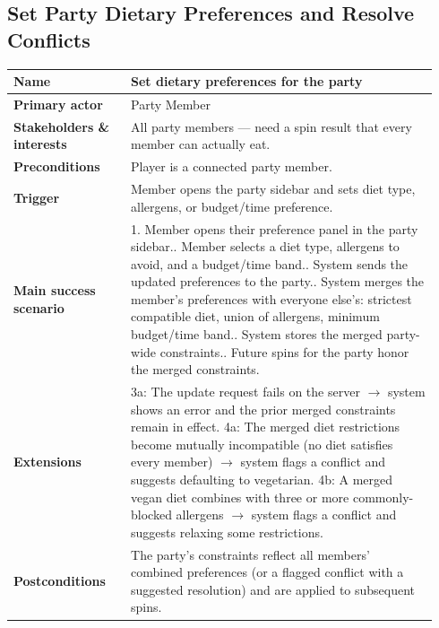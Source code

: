 \documentclass[sigconf]{acmart}
\begin{document}
\subsection*{Set Party Dietary Preferences and Resolve Conflicts}
{\footnotesize
\begin{supertabular}{@{}p{0.26\linewidth}p{0.68\linewidth}@{}}
\textbf{Name} & Set dietary preferences for the party \\
\hline
\textbf{Primary actor} & Party Member \\
\hline
\textbf{Stakeholders \& interests} & All party members --- need a spin result that every member can actually eat. \\
\hline
\textbf{Preconditions} & Player is a connected party member. \\
\hline
\textbf{Trigger} & Member opens the party sidebar and sets diet type, allergens, or budget/time preference. \\
\hline
\textbf{Main success scenario} & 1. Member opens their preference panel in the party sidebar.. Member selects a diet type, allergens to avoid, and a budget/time band.. System sends the updated preferences to the party.. System merges the member's preferences with everyone else's: strictest compatible diet, union of allergens, minimum budget/time band.. System stores the merged party-wide constraints.. Future spins for the party honor the merged constraints. \\
\hline
\textbf{Extensions} & 3a: The update request fails on the server $\rightarrow$ system shows an error and the prior merged constraints remain in effect.\newline
4a: The merged diet restrictions become mutually incompatible (no diet satisfies every member) $\rightarrow$ system flags a conflict and suggests defaulting to vegetarian.\newline
4b: A merged vegan diet combines with three or more commonly-blocked allergens $\rightarrow$ system flags a conflict and suggests relaxing some restrictions. \\
\hline
\textbf{Postconditions} & The party's constraints reflect all members' combined preferences (or a flagged conflict with a suggested resolution) and are applied to subsequent spins. \\
\end{supertabular}
}
\end{document}
